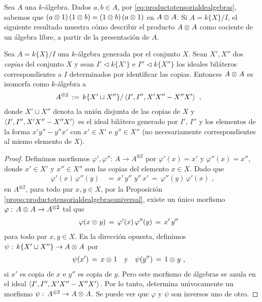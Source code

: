 Sea $A$ una $k$-\'{a}lgebra. Dados $a,b\in A$, por
\eqref{eq:productotensorialdealgebras}, sabemos que
$(a\otimes_{} 1)\,(1\otimes_{} b)=(1\otimes_{} b)\,(a\otimes_{} 1)$ en $A\otimes_{} A$. Si
$A=k\{X\}/I$, el siguiente resultado muestra c\'{o}mo describir el producto
$A\otimes_{} A$ como cociente de un \'{a}lgebra libre, a partir de la
presentaci\'{o}n de $A$.

\begin{propoProductoTensorialDeAlgebras}%
	\label{propo:productotensorialdealgebrascociente}
	Sea $A=k\{X\}/I$ una $k$-\'{a}lgebra generada por el conjunto $X$.
	Sean $X',X''$ dos \emph{copias} del conjunto $X$ y sean
	$I'\triangleleft k\{X'\}$ e $I''\triangleleft k\{X''\}$ los ideales
	bil\'{a}teros correspondientes a $I$ determinados por identificar
	las copias. Entonces $A\otimes_{} A$ es isomorfa como $k$-\'{a}lgebra a
	\begin{align*}
		A^{\otimes 2} & \,:=\,k\{X'\sqcup X''\}/
			\left\langle{I',I'',X'X''-X''X'}\right\rangle_{}
		\text{ ,}
	\end{align*}
	donde $X'\sqcup X''$ denota la uni\'{o}n disjunta de las copias de $X$
	y $\left\langle{I',I'',X'X''-X''X'}\right\rangle_{}$ es el ideal bil\'{a}tero generado por
	$I'$, $I''$ y los elementos de la forma $x'y''-y''x'$ con $x'\in X'$ e
	$y''\in X''$ (no necesariamente correspondientes al mismo elemento de
	$X$).
\end{propoProductoTensorialDeAlgebras}

\begin{proof}
	Definimos morfismos $\varphi',\varphi'':\,A\rightarrow A^{\otimes 2}$
	por $\varphi'(x)=x'$ y $\varphi''(x)=x''$, donde $x'\in X'$ y
	$x''\in X''$ son las copias del elemento $x\in X$. Dado que
	\begin{align*}
		\varphi'(x)\,\varphi''(y) & \,=\,x'\,y''\,\,y''\,x'\,=\,
			\varphi''(y)\,\varphi'(x)
		\text{ ,}
	\end{align*}
	en $A^{\otimes 2}$, para todo par $x,y\in X$, por la Proposici\'{o}n~%
	\ref{propo:productotensorialdealgebrasuniversal}, existe un \'{u}nico
	morfismo $\varphi:\,A\otimes_{} A\rightarrow A^{\otimes 2}$ tal que
	\begin{align*}
		\varphi(x\otimes_{} y) & \,=\,\varphi'(x)\,\varphi''(y)\,=\,
			x'\,y''
	\end{align*}
	para todo par $x,y\in X$. En la direcci\'{o}n opuesta, definimos
	$\psi:\,k\{X'\sqcup X''\}\rightarrow A\otimes_{} A$ por
	\begin{align*}
		\psi(x') \,=\,x\otimes_{} 1 & \quad\text{y}\quad
		\psi(y'') \,=\,1\otimes_{} y
		\text{ ,}
	\end{align*}
	si $x'$ es copia de $x$ e $y''$ es copia de $y$. Pero este morfismo de
	\'{a}lgebras se anula en el ideal $\left\langle{I',I'',X'X''-X''X'}\right\rangle_{}$. Por
	lo tanto, determina un\'{\i}vocamente un morfismo
	$\psi:\,A^{\otimes 2}\rightarrow A\otimes_{} A$. Se puede ver que
	$\varphi$ y $\psi$ son inversos uno de otro.
\end{proof}

